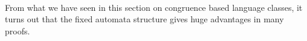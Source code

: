
\

From what we have seen in this section on congruence based language classes, it turns out that the fixed automata structure gives huge advantages in many proofs.

